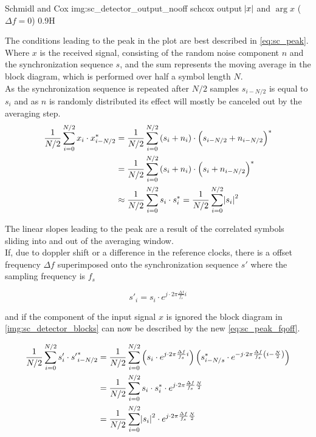 \begin{subchapter}{Schmidl and Cox}
               {img:sc_detector_output_nooff}
               {\acrshort{schcox} output $\abs{x}$ and $\arg{x}$ ($\Delta f=0$)}
               {0.9}{H}

  The conditions leading to the peak in the plot are best
  described in \autoref{eq:sc_peak}.
  Where $x$ is the received signal, consisting of the
  random noise component $n$ and the synchronization sequence $s$,
  and the sum represents the moving average in the block diagram,
  which is performed over half a symbol length $N$. \\

  As the synchronization sequence is repeated after $N/2$ samples
  $s_{i-N/2}$ is equal to $s_{i}$ and as $n$ is randomly distributed
  its effect will mostly be canceled out by the averaging step. \\

  \begin{align}
    \label{eq:sc_peak}
    \frac{1}{N/2} \sum_{i=0}^{N/2} x_{i} \cdot x_{i-N/2}^\ast &=
    \frac{1}{N/2} \sum_{i=0}^{N/2} \left(s_{i} + n_{i} \right) \cdot \left(s_{i-N/2} + n_{i-N/2} \right)^\ast \nonumber \\
    &= \frac{1}{N/2} \sum_{i=0}^{N/2} \left(s_{i} + n_{i} \right) \cdot \left(s_{i} + n_{i-N/2} \right)^\ast \nonumber \\
    &\approx \frac{1}{N/2} \sum_{i=0}^{N/2} s_{i} \cdot s_{i}^\ast
    = \frac{1}{N/2} \sum_{i=0}^{N/2} \abs{s_{i}}^2
  \end{align}

  The linear slopes leading to the peak are a result of the
  correlated symbols sliding into and out of the averaging
  window. \\

  If, due to doppler shift or a difference in the reference clocks,
  there is a offset frequency $\Delta f$ superimposed onto the
  synchronization sequence $s'$ where the sampling frequency is $f_s$

  \begin{equation*}
    s'_{i}= s_{i} \cdot e^{j\cdot 2 \pi \frac{\Delta f}{f_s}i}
  \end{equation*}

  and if the component of the input signal $x$ is ignored the
  block diagram in \autoref{img:sc_detector_blocks} can
  now be described by the new \autoref{eq:sc_peak_fqoff}.

  \begin{align}
    \label{eq:sc_peak_fqoff}
    \frac{1}{N/2} \sum_{i=0}^{N/2} s'_{i} \cdot {s'}_{i-N/2}^{\ast}
    &= \frac{1}{N/2} \sum_{i=0}^{N/2}
     \left( s_{i} \cdot e^{j\cdot 2 \pi \frac{\Delta f}{f_s}i} \right)
     \left( s_{i-N/s}^{\ast} \cdot e^{-j\cdot 2 \pi \frac{\Delta f}{f_s} \left( i- \frac{N}{2} \right)} \right) \nonumber \\
    &= \frac{1}{N/2} \sum_{i=0}^{N/2} s_{i} \cdot s_{i}^\ast \cdot e^{j\cdot 2 \pi \frac{\Delta f}{f_s} \frac{N}{2}} \nonumber \\
    &= \frac{1}{N/2} \sum_{i=0}^{N/2} \abs{s_{i}}^2 \cdot e^{j\cdot 2 \pi \frac{\Delta f}{f_s} \frac{N}{2}}
  \end{align}


\end{subchapter}
